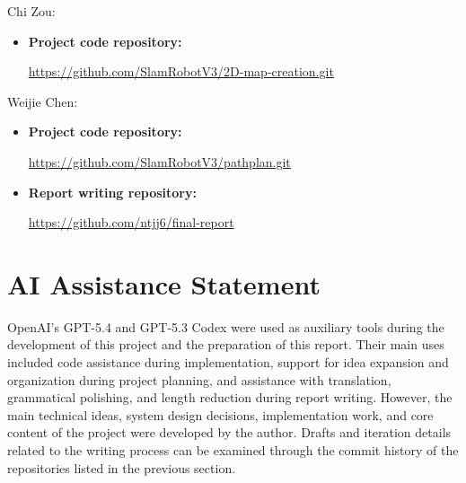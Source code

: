 \documentclass[12pt]{interim_report}
\begin{document}
Chi Zou:
\begin{itemize}
    \item \textbf{Project code repository:}
    
    \url{https://github.com/SlamRobotV3/2D-map-creation.git}
\end{itemize}

Weijie Chen:
\begin{itemize}
    \item \textbf{Project code repository:}
    
    \url{https://github.com/SlamRobotV3/pathplan.git}
    
    \item \textbf{Report writing repository:}
    
    \url{https://github.com/ntjj6/final-report}
\end{itemize}

\section{AI Assistance Statement}

OpenAI's GPT-5.4 and GPT-5.3 Codex were used as auxiliary tools during the development of this project and the preparation of this report. Their main uses included code assistance during implementation, support for idea expansion and organization during project planning, and assistance with translation, grammatical polishing, and length reduction during report writing. However, the main technical ideas, system design decisions, implementation work, and core content of the project were developed by the author. Drafts and iteration details related to the writing process can be examined through the commit history of the repositories listed in the previous section.
\end{document}
